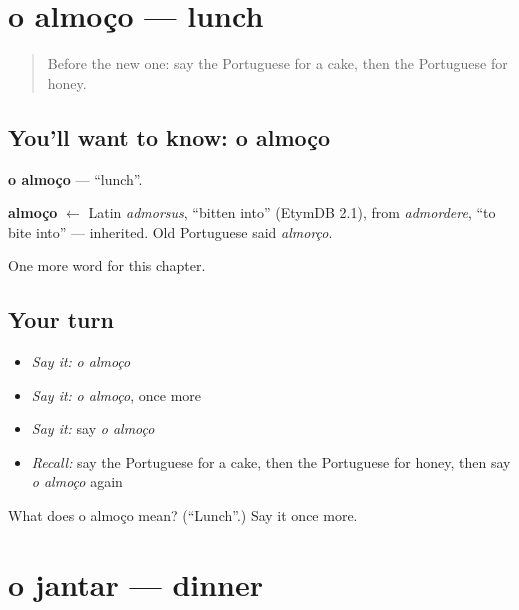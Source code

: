 \section[o almoço]{o almoço — lunch}

\label{lesson:PT-C47-almoco}



\begin{quote}
Before the new one: say the Portuguese for a cake, then the Portuguese for honey.
\end{quote}

\subsection*{You'll want to know: o almoço}
\textbf{o almoço} — \textquotedblleft{}lunch\textquotedblright{}.

\begin{cousinweb}
\textbf{almoço} $\leftarrow$ Latin \emph{admorsus}, \textquotedblleft{}bitten into\textquotedblright{} (EtymDB 2.1), from \emph{admordere}, \textquotedblleft{}to bite into\textquotedblright{} — inherited. Old Portuguese said \emph{almorço}.
\end{cousinweb}

\begin{grammarlens}[title={What you've built}]
One more word for this chapter.
\end{grammarlens}

\subsection*{Your turn}
\begin{itemize}
\raggedright
  \item \emph{Say it:} \emph{o almoço}
  \item \emph{Say it:} \emph{o almoço}, once more
  \item \emph{Say it:} say \emph{o almoço}
  \item \emph{Recall:} say the Portuguese for a cake, then the Portuguese for honey, then say \emph{o almoço} again
\end{itemize}

\begin{tcolorbox}[breakable,colback=teal!4,colframe=teal!35!black,title={Before you move on}]
What does o almoço mean? (\textquotedblleft{}Lunch\textquotedblright{}.) Say it once more.
\end{tcolorbox}
\section[o jantar]{o jantar — dinner}


